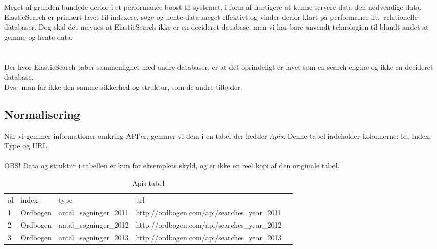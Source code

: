 Meget af grunden bundede derfor i et performance boost til systemet, i form af hurtigere at kunne servere data den nødvendige data.
\\
ElasticSearch er primært lavet til indexere, søge og hente data meget effektivt og vinder derfor klart på performance ift.\ relationelle databaser.
Dog skal det nævnes at ElasticSearch ikke er en decideret database, men vi har bare anvendt teknologien til blandt andet at gemme og hente data.\\
\\\\
Der hvor ElasticSearch taber sammenlignet med andre databaser, er at det oprindeligt er lavet som en search engine og ikke en decideret database.
\\Dvs.\ man får ikke den samme sikkerhed og struktur, som de andre tilbyder.
\subsection{Normalisering}
Når vi gemmer informationer omkring API'er, gemmer vi dem i en tabel der hedder \textit{Apis}. Denne tabel indeholder kolonnerne: Id, Index, Type og URL.
\\\\
OBS! Data og struktur i tabellen er kun for eksemplets skyld, og er ikke en reel kopi af den originale tabel.
\begin{table}[H]
    \centering
    \begin{tabular}{|l|l|l|l|l}
        \cline{1-4}
        id & index  &  type &  url &  \\ \cline{1-4}
        1 & Ordbogen & antal\_søgninger\_2011 & http://ordbogen.com/api/searches\_year\_2011 &  \\ \cline{1-4}
        2 & Ordbogen & antal\_søgninger\_2012 & http://ordbogen.com/api/searches\_year\_2012 &  \\ \cline{1-4}
        3 & Ordbogen & antal\_søgninger\_2013 & http://ordbogen.com/api/searches\_year\_2013 &  \\ \cline{1-4}
    \end{tabular}
    \caption{Apis tabel}
    \label{table:api-tabel}
\end{table}

